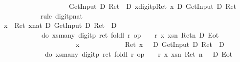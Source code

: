 \begin{isabellebody}
\ \ \ \ \ \ \isamarkupfalse%
\ {\isacharminus}\ %
\isanewline
\ \ \ \ \ \ \ \ \isamarkupfalse%
\ {\isachardoublequote}{\isasymturnstile}\ GetInput\ {\isacharequal}\isactrlsub D\ Ret\ {\isacharbrackleft}{}{\isacharbrackright}\ {\isasymlongrightarrow}\isactrlsub D\ {\isasymlangle}x{\isasymleftarrow}digitp{\isasymrangle}{\isacharparenleft}Ret\ {\isacharparenleft}x{\isacharequal}{}{\isacharparenright}\ {\isasymand}\isactrlsub D\ GetInput\ {\isacharequal}\isactrlsub D\ Ret\ {\isacharbrackleft}{\isacharbrackright}{\isacharparenright}{\isachardoublequote}\isanewline
\ \ \ \ \ \ \ \ \ \ \isamarkupfalse%
\ {\isacharparenleft}rule\ digitp{\isacharunderscore}nat{\isacharparenright}\isanewline
\ \ \ \ \ \ \ \ \isamarkupfalse%
\isanewline
\ \ \ \ \ \ \ \ \isamarkupfalse%
\ {\isachardoublequote}{\isasymforall}x{\isachardot}\ {\isasymturnstile}\ {\isacharparenleft}Ret\ {\isacharparenleft}x{\isacharequal}{\isacharparenleft}{}{\isacharcolon}{\isacharcolon}nat{\isacharparenright}{\isacharparenright}\ {\isasymand}\isactrlsub D\ GetInput\ {\isacharequal}\isactrlsub D\ Ret\ {\isacharbrackleft}{\isacharbrackright}{\isacharparenright}\ {\isasymlongrightarrow}\isactrlsub D\isanewline
\ \ \ \ \ \ \ \ \ \ \ \ {\isacharparenleft}{\isasymlangle}do\ {\isacharbraceleft}xs{\isasymleftarrow}many\ digitp{\isacharsemicolon}\ ret\ {\isacharparenleft}foldl\ {\isacharparenleft}{\isasymlambda}r{\isachardot}\ op\ {\isacharplus}\ {\isacharparenleft}{}{}\ {\isacharasterisk}\ r{\isacharparenright}{\isacharparenright}\ x\ xs{\isacharparenright}{\isacharbraceright}{\isasymrangle}{\isacharparenleft}{\isasymlambda}n{\isachardot}\ Ret{\isacharparenleft}n{\isacharequal}{}{\isacharparenright}\ {\isasymand}\isactrlsub D\ Eot{\isacharparenright}{\isacharparenright}{\isachardoublequote}\isanewline
\ \ \ \ \ \ \ \ \isamarkupfalse%
\ %
\isanewline
\ \ \ \ \ \ \ \ \ \ \isamarkupfalse%
\ x\isanewline
\ \ \ \ \ \ \ \ \ \ \isamarkupfalse%
\ {\isachardoublequote}{\isasymturnstile}\ Ret\ {\isacharparenleft}x\ {\isacharequal}\ {}{\isacharparenright}\ {\isasymand}\isactrlsub D\ GetInput\ {\isacharequal}\isactrlsub D\ Ret\ {\isacharbrackleft}{\isacharbrackright}\ {\isasymlongrightarrow}\isactrlsub D\isanewline
\ \ \ \ \ \ \ \ \ \ \ \ \ {\isasymlangle}do\ {\isacharbraceleft}xs{\isasymleftarrow}many\ digitp{\isacharsemicolon}\ ret\ {\isacharparenleft}foldl\ {\isacharparenleft}{\isasymlambda}r{\isachardot}\ op\ {\isacharplus}\ {\isacharparenleft}{}{}\ {\isacharasterisk}\ r{\isacharparenright}{\isacharparenright}\ x\ xs{\isacharparenright}{\isacharbraceright}{\isasymrangle}{\isacharparenleft}{\isasymlambda}n{\isachardot}\ Ret\ {\isacharparenleft}n\ {\isacharequal}\ {}{\isacharparenright}\ {\isasymand}\isactrlsub D\ Eot{\isacharparenright}{\isachardoublequote}\isanewline

\end{isabellebody}
